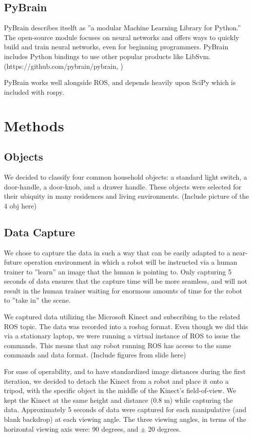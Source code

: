 \documentclass{article}
\begin{document}
\subsection{PyBrain}
PyBrain describes itselft as ''a modular Machine Learning Library for Python.'' The open-source module focuses on neural networks and offers ways to quickly build and train neural networks, even for beginning programmers. PyBrain includes Python bindings to use other popular products like LibSvm. (https://github.com/pybrain/pybrain, ) 

PyBrain works well alongside ROS, and depends heavily upon SciPy which is included with rospy.

\section{Methods}
\subsection{Objects}
We decided to classify four common household objects: a standard light switch, a door-handle, a door-knob, and a drawer handle. These objects were selected
for their ubiquity in many residences and living environments. (Include picture of the 4 obj here)

\subsection{Data Capture}
We chose to capture the data in such a way that can be easily adapted to a near-future operation environment in which a robot will be instructed via a human trainer to ''learn'' an image that the human is pointing to.  Only capturing 5 seconds of data ensures that the capture time will be more seamless, and will not result in the human trainer waiting for enormous amounts of time for the robot to ''take in'' the scene.  

We captured data utilizing the Microsoft Kinect and subscribing to the related ROS topic.  The data was recorded into a rosbag format.  Even though we did this via a stationary laptop, we were running a virtual instance of ROS to issue the commands. This means that any robot running ROS has access to the same commands and data format. (Include figures from slide here)

For ease of operability, and to have standardized image distances during the first iteration, we decided to detach the Kinect from a robot and place it onto a tripod, with the specific object in the middle of the Kinect's field-of-view. We kept the Kinect at the same height and distance (0.8 m) while capturing the data. Approximately 5 seconds of data were captured for each manipulative (and blank backdrop) at each viewing angle. The three viewing angles, in terms of the horizontal viewing axis were: 90 degrees, and \(\pm\) 20 degrees.
\end{document}
